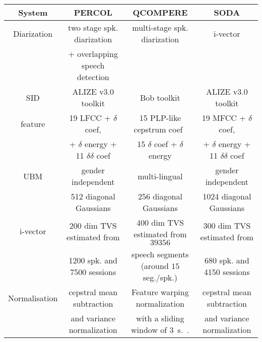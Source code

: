 \begin{table*}[t]
  \centering
  \begin{tabular}{|c|c|c|c|}
    \hline
    System          & PERCOL                                        & QCOMPERE                                        & SODA      \\
    \hline    
    Diarization     & two stage spk. diarization \cite{charlet2013}                   &  multi-stage spk. diarization \cite{Barras2006} &  i-vector \cite{dupuy2014}         \\
                    & + overlapping speech detection                &                                                 &           \\
    \hline    
    SID             & ALIZE v3.0 toolkit \cite{larcher2013}         & Bob toolkit \cite{bob2012}                      &  ALIZE v3.0 toolkit \cite{larcher2013}  \\
    \hline    
    feature         & 19 LFCC + $\delta$ coef,                      & 15 PLP-like cepstrum coef~\cite{Hermansky1990}  &  19 MFCC + $\delta$ coef,         \\
                    & + $\delta$ energy + 11 $\delta$$\delta$ coef  & 15 $\delta$ coef + $\delta$ energy              &  + $\delta$ energy + 11 $\delta$$\delta$ coef  \\
    \hline    
    UBM             & gender independent                            & multi-lingual                          &  gender independent         \\
                    & 512 diagonal Gaussians                                       &      256 diagonal Gaussians                                           &  1024 diagonal Gaussians         \\
    \hline    
    i-vector        & 200 dim TVS estimated from                    & 400 dim TVS estimated from $39356$               &  300 dim TVS estimated from         \\
                    & 1200 spk. and 7500 sessions                    & speech segments (around $15$ seg./spk.)           &  680 spk. and 4150 sessions         \\
    \hline    
    Normalisation   & cepstral mean subtraction                     & Feature warping normalization            &  cepstral mean subtraction         \\
                    & and variance normalization                    & with a sliding window of $3$~s.~\cite{Pelecanos2001}.  &   and variance normalization        \\

\end{tabular}
\end{table*}
